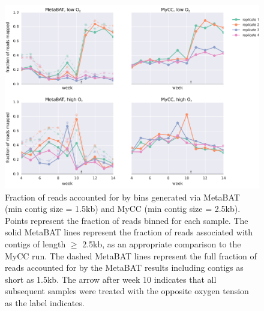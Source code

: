 \begin{figure}[H]
\centering
    \includegraphics[width=1.0\textwidth]{./tex/chapter2/figures/170201_comparable_read_coverage_for_metabat_and_mycc_3kb--INKSCAPED.pdf}
    \begin{singlespace}
    \caption[Fraction of reads accounted for by MetaBAT and MyCC bins.]{
        Fraction of reads accounted for by bins generated via MetaBAT (min contig size = 1.5kb) and MyCC (min contig size = 2.5kb).
        Points represent the fraction of reads binned for each sample.
        The solid MetaBAT lines represent the fraction of reads associated with contigs of length $\geq$ 2.5kb, as an appropriate comparison to the MyCC run.
        The dashed MetaBAT lines represent the full fraction of reads accounted for by the MetaBAT results including contigs as short as 1.5kb.
        The arrow after week 10 indicates that all subsequent samples were treated with the opposite oxygen tension as the label indicates.
    }
    \label{fig:mycc_contamination}
    \end{singlespace}
\end{figure}


